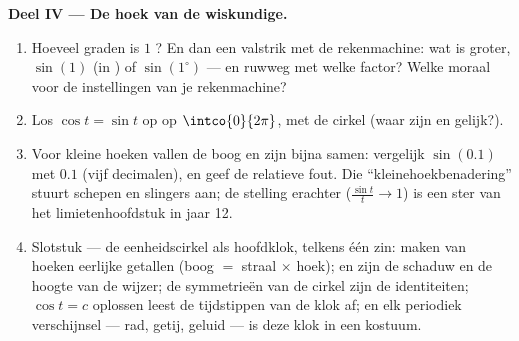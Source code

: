 \begin{problem}
\medskip
\noindent\textbf{Deel IV --- De hoek van de wiskundige.}
\begin{enumerate}[resume]
  \item Hoeveel graden is $1$ ? En dan een valstrik met de
        rekenmachine: wat is groter, $\sin(1)$ (in ) of
        $\sin(1^\circ)$ --- en ruwweg met welke factor? Welke moraal voor de
        instellingen van je rekenmachine?
  \item Los $\cos t = \sin t$ op op $\intco{0}{2\pi}$, met de cirkel (waar
        zijn  en  gelijk?).
  \item Voor kleine hoeken vallen de boog en zijn  bijna samen:
        vergelijk $\sin(0.1)$ met $0.1$ (vijf decimalen), en geef de
        relatieve fout. Die ``kleinehoekbenadering'' stuurt schepen en
        slingers aan; de stelling erachter ($\frac{\sin t}{t} \to 1$) is een
        ster van het limietenhoofdstuk in jaar 12.
  \item Slotstuk --- de eenheidscirkel als hoofdklok, telkens één zin:
         maken van hoeken eerlijke getallen (boog $=$ straal
        $\times$ hoek);  en  zijn de schaduw en de hoogte van de
        wijzer; de symmetrieën van de cirkel zijn de identiteiten;
        $\cos t = c$ oplossen leest de tijdstippen van de klok af; en elk
        periodiek verschijnsel --- rad, getij, geluid --- is deze klok in een
        kostuum.
\end{enumerate}
\end{problem}
